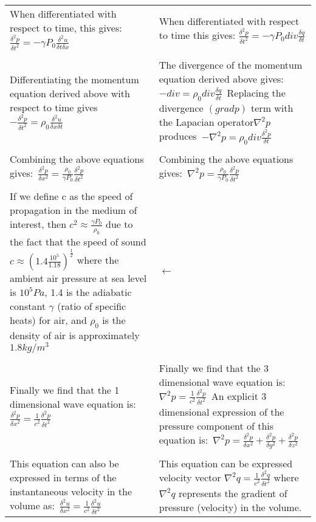 \begin{center}
\begin{longtable}{|p{}|p{}|}
\\
When differentiated with respect to time, this gives: $\frac{\delta^2 p}{\delta t^2} = -\gamma P_0\frac{\delta^2 u}{\delta t \delta x}$ & When differentiated with respect to time this gives: $\frac{\delta^2 p}{\delta t^2} = -\gamma P_0 div \frac{\delta q}{\delta t}$\\
\\
Differentiating the momentum equation derived above with respect to time gives $-\frac{\delta^2 p}{\delta t^2}=\rho_0\frac{\delta^2 u}{\delta x \delta t}$ & The divergence of the momentum equation derived above gives:\ $-div = \rho_0 div \frac{\delta q}{\delta t}$\ Replacing the divergence $(grad p)$ term with the Lapacian operator$\nabla^2 p$ produces\ $-\nabla^2 p = \rho_0 div \frac{\delta^2 p}{\delta t}$\\
\\
Combining the above equations gives:\ $\frac{\delta^2 p}{\delta x^2}=\frac{\rho_0}{\gamma P_0}\frac{\delta^2 p}{\delta t^2} $ & Combining the above equations gives:\ $\nabla^2 p = \frac{\rho_0}{\gamma P_0}\frac{\delta^2 p}{\delta t^2}$ \\
\\
If we define c as the speed of propagation in the medium of interest, then $c^2\approx \frac{\gamma P_0}{\rho_0}$ due to the fact that the speed of sound $c \approx (1.4\frac{10^5}{1.18})^\frac{1}{2}$ where the ambient air pressure at sea level is $10^5Pa$, 1.4 is the adiabatic constant $\gamma$ (ratio of specific heats) for air, and $\rho_0$ is the density of air is approximately $1.8kg/m^3 $   & $\leftarrow$ \\
\\
Finally we find that the 1 dimensional wave equation is:\ $\frac{\delta^2 p}{\delta x^2}=\frac{1}{c^2}\frac{\delta^2 p}{\delta t^2}$ & Finally we find that the 3 dimensional wave equation is:\ $\nabla^2 p = \frac{1}{c^2}\frac{\delta^2 p}{\delta t^2}$\ An explicit 3 dimensional expression of the pressure component of this equation is:\ $\nabla^2 p = \frac{\delta^2p}{\delta x^2}+\frac{\delta^2p}{\delta y^2}+\frac{\delta^2p}{\delta z^2}$ \\
\\
This equation can also be expressed in terms of the instantaneous velocity in the volume as:\ $\frac{\delta^2 u}{\delta x^2}=\frac{1}{c^2}\frac{\delta^2 u}{\delta t^2}$ & This equation can be expressed velocity vector $\nabla^2 q = \frac{1}{c^2}\frac{\delta^2 q}{\delta t^2}$ where $\nabla^2 q$ represents the gradient of pressure (velocity) in the volume.\\
\hline
\end{longtable}
\end{center}

